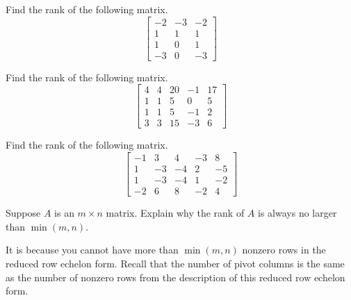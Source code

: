 \documentclass{ximera}
\begin{document}
\begin{problem}\label{prb:2.52} Find the rank of the following matrix.
\begin{equation*}
\left[
\begin{array}{rrr}
-2 & -3 & -2 \\
1 & 1 & 1 \\
1 & 0 & 1 \\
-3 & 0 & -3
\end{array}
\right]
\end{equation*}
\end{problem}

\begin{problem}\label{prb:2.53} Find the rank of the following matrix.
\begin{equation*}
\left[
\begin{array}{rrrrr}
4 & 4 & 20 & -1 & 17 \\
1 & 1 & 5 & 0 & 5 \\
1 & 1 & 5 & -1 & 2 \\
3 & 3 & 15 & -3 & 6
\end{array}
\right]
\end{equation*}
\end{problem}

\begin{problem}\label{prb:2.54} Find the rank of the following matrix.
\begin{equation*}
\left[
\begin{array}{rrrrr}
-1 & 3 & 4 & -3 & 8 \\
1 & -3 & -4 & 2 & -5 \\
1 & -3 & -4 & 1 & -2 \\
-2 & 6 & 8 & -2 & 4
\end{array}
 \right]
\end{equation*}
\end{problem}

\begin{problem}\label{prb:2.55} Suppose $A$ is an $m\times n$ matrix. Explain why the rank of $A$ is
always no larger than $\min \left( m,n\right) .$
\begin{hint}
It is because you cannot
have more than $\min \left( m,n\right) $ nonzero rows in the reduced row echelon form. Recall that the number of pivot columns is the same as the
number of nonzero rows from the description of this reduced row echelon form.
\end{hint}
\end{problem}
\end{document}
